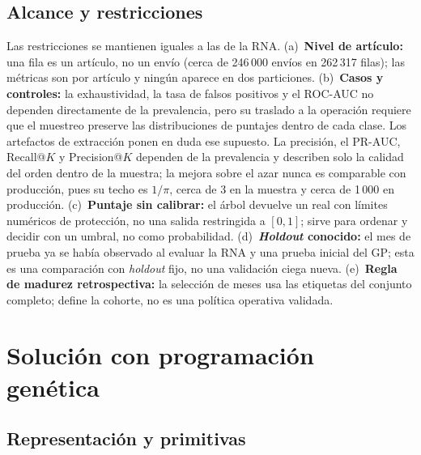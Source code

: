 \documentclass[conference]{IEEEtran}
\newcommand{\col}[1]{\texttt{\detokenize{#1}}}
\begin{document}
\subsection{Alcance y restricciones}
\label{sec:alcance}

Las restricciones se mantienen iguales a las de la RNA. (a)~\textbf{Nivel de
artículo:} una fila es un artículo, no un envío (cerca de 246\,000 envíos en
262\,317 filas); las métricas son por artículo y ningún \col{SHIPMENT_ID}
aparece en dos particiones. (b)~\textbf{Casos y controles:} la exhaustividad,
la tasa de falsos positivos y el ROC-AUC no dependen directamente de la
prevalencia, pero su traslado a la operación requiere que el muestreo preserve
las distribuciones de puntajes dentro de cada clase. Los artefactos de
extracción ponen en duda ese supuesto. La precisión,
el PR-AUC, Recall@$K$ y Precision@$K$ dependen de la prevalencia y describen
solo la calidad del orden dentro de la muestra; la mejora sobre el azar nunca
es comparable con producción, pues su techo es $1/\pi$, cerca de 3 en la
muestra y cerca de 1\,000 en producción. (c)~\textbf{Puntaje sin calibrar:}
el árbol devuelve un real con límites numéricos de protección, no una salida
restringida a $[0,1]$; sirve para ordenar y decidir con un umbral,
no como probabilidad. (d)~\textbf{\textit{Holdout} conocido:} el mes de
prueba ya se había observado al evaluar la RNA y una prueba inicial del GP;
esta es una comparación con \textit{holdout} fijo, no una validación ciega
nueva. (e)~\textbf{Regla de madurez retrospectiva:} la selección de meses usa
las etiquetas del conjunto completo; define la cohorte, no es una política
operativa validada.

\section{Solución con programación genética}

\subsection{Representación y primitivas}
\end{document}

